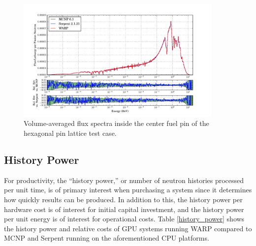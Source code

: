 \documentclass[preprint,12pt]{elsarticle}
\begin{document}
\begin{figure}[h!]
\centering
\includegraphics[width=0.9\textwidth,trim= 1cm 0cm 1cm 0cm]{graphics/assembly-lw_spec.pdf}
\caption{Volume-averaged flux spectra inside the center fuel pin of the hexagonal pin lattice test case. \label{assembly-lw_spec} }
\end{figure}

\newpage
\subsection{History Power}

For productivity, the ``history power,'' or  number of neutron histories processed per unit time, is of primary interest when purchasing a system since it determines how quickly results can be produced.  In addition to this, the history power per hardware cost is of interest for initial capital investment, and the history power per unit energy is of interest for operational costs.  Table \ref{history_power} shows the history power and relative costs of GPU systems running WARP compared to MCNP and Serpent running on the aforementioned CPU platforms.  
\end{document}
